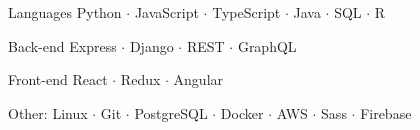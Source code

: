 


\begin{cvskills}

\cvskill
  {Languages } %
  {Python $\cdot$ JavaScript $\cdot$ TypeScript $\cdot$ Java $\cdot$ SQL $\cdot$ R } %


  \cvskill
    {Back-end} %
    {Express $\cdot$ Django $\cdot$ REST $\cdot$ GraphQL} %

  \cvskill
    {Front-end} %
    {React $\cdot$ Redux $\cdot$ Angular} %

\cvskill
  {Other:} %
  {Linux $\cdot$ Git $\cdot$ PostgreSQL $\cdot$ Docker $\cdot$ AWS $\cdot$ Sass $\cdot$ Firebase  } %




\end{cvskills}

